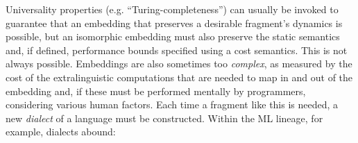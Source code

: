 \documentclass[10pt,preprint]{sigplanconf}
\begin{document}
Universality properties (e.g. ``Turing-completeness'') can usually be invoked to guarantee that an embedding that preserves a desirable fragment's dynamics is possible, but an isomorphic embedding must also preserve the static semantics and, if defined, performance bounds specified using a cost semantics. This is not always possible. 
Embeddings are also sometimes too \emph{complex}, as measured by the cost of the extralinguistic computations that are needed to map in and out of the embedding and, if these  must be performed mentally by programmers, considering various human factors. %
Each time a fragment like this is needed, a new \emph{dialect} of a language must be constructed. Within the ML lineage, for example, dialects abound:
%
\end{document}
